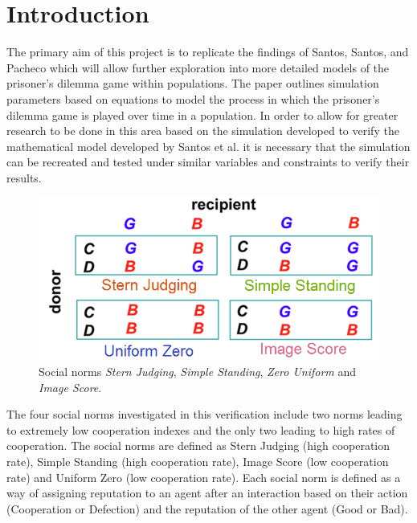 \documentclass[10pt,a4paper]{article}
\begin{document}
\section{Introduction}
The primary aim of this project is to replicate the findings of Santos, Santos, and Pacheco which will allow further exploration into more detailed models of the prisoner’s dilemma game within populations. The paper outlines simulation parameters based on equations to model the process in which the prisoner’s dilemma game is played over time in a population. 
In order to allow for greater research to be done in this area based on the simulation developed to verify the mathematical model developed by Santos et al. it is necessary that the simulation can be recreated and tested under similar variables and constraints to verify their results.
\\

\begin{figure}
  \includegraphics[width=\linewidth]{Images/social_norms.PNG}
  \caption{Social norms \textit{Stern Judging}, \textit{Simple Standing}, \textit{Zero Uniform} and \textit{Image Score}.}
  \label{fig:Runtime1}
\end{figure}

The four social norms investigated in this verification include two norms leading to extremely low cooperation indexes and the only two leading to high rates of cooperation.
The social norms are defined as Stern Judging (high cooperation rate), Simple Standing (high cooperation rate), Image Score (low cooperation rate) and Uniform Zero (low cooperation rate).
Each social norm is defined as a way of assigning reputation to an agent after an interaction based on their action (Cooperation or Defection) and the reputation of the other agent (Good or Bad).
\end{document}

